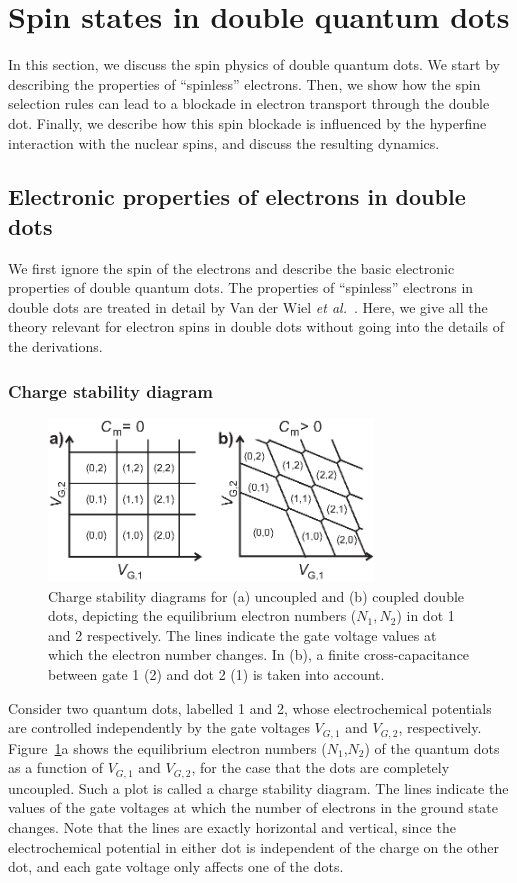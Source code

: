 \documentclass[12pt,aps,nofootinbib]{revtex4-1}
\begin{document}
\section{Spin states in double quantum dots}
\label{Section:DoubleDotSpin} In this section, we discuss the spin
physics of double quantum dots. We start by describing the
properties of ``spinless'' electrons. Then, we show how the spin
selection rules can lead to a blockade in electron transport
through the double dot. Finally, we describe how this spin
blockade is influenced by the hyperfine interaction with the
nuclear spins, and discuss the resulting dynamics.

\subsection{Electronic properties of electrons in double dots}
\label{DDspinless} We first ignore the spin of the electrons and
describe the basic electronic properties of double quantum dots.
The properties of ``spinless'' electrons in double dots are
treated in detail by Van der Wiel \textit{et
al.}~\cite{WielRMP2003}. Here, we give all the theory relevant for
electron spins in double dots without going into the details of
the derivations.

\subsubsection{Charge stability diagram}
\begin{figure}[htb]
\includegraphics[width=3.4in, clip=true]{hanson_fig27.eps}
\caption{Charge stability diagrams for (a) uncoupled and (b)
coupled double dots, depicting the equilibrium electron numbers
($N_1,N_2$) in dot 1 and 2 respectively. The lines indicate the
gate voltage values at which the electron number changes. In (b),
a finite cross-capacitance between gate 1 (2) and dot 2 (1) is
taken into account.} \label{Fig:DDChargDiagr}
\end{figure}

Consider two quantum dots, labelled 1 and 2, whose electrochemical
potentials are controlled independently by the gate voltages
$V_{G,1}$ and $V_{G,2}$, respectively.
Figure~\ref{Fig:DDChargDiagr}a shows the equilibrium electron
numbers ($N_1$,$N_2$) of the quantum dots as a function of
$V_{G,1}$ and $V_{G,2}$, for the case that the dots are completely
uncoupled. Such a plot is called a charge stability diagram. The
lines indicate the values of the gate voltages at which the number
of electrons in the ground state changes. Note that the lines are
exactly horizontal and vertical, since the electrochemical
potential in either dot is independent of the charge on the other
dot, and each gate voltage only affects one of the dots.
\end{document}

